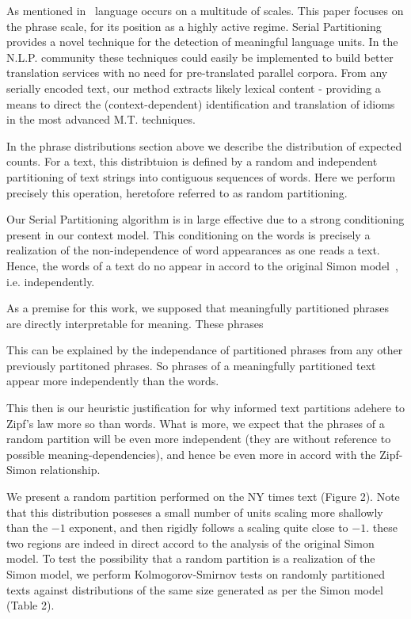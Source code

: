 As mentioned in~\cite{williams2013a} language occurs on a multitude of
scales. 
This paper focuses on the phrase scale, for its position as a highly
active regime.
Serial Partitioning provides a novel technique for the detection of
meaningful language units.  
In the N.L.P. community these techniques could easily be implemented
to build better translation services with no need for pre-translated
parallel corpora.  
From any serially encoded text, our method extracts likely lexical
content - providing a means to direct the (context-dependent)
identification and translation of idioms in the most advanced
M.T. techniques.

In the phrase distributions section above we describe the distribution
of expected counts.
For a text, this distribtuion is defined by a random and independent
partitioning of text strings into contiguous sequences of words.
Here we perform precisely this operation, heretofore referred to as
random partitioning.

Our Serial Partitioning algorithm is in large effective due to a
strong conditioning present in our context model.
This conditioning on the words is precisely a realization of the
non-independence of word appearances as one reads a text.
Hence, the words of a text do no appear in accord to the original
Simon model~\cite{simon1955a}, i.e. independently.

As a premise for this work, we supposed that meaningfully partitioned
phrases are directly interpretable for meaning.
These phrases

This can be explained by the independance of partitioned phrases from
any other previously partitoned phrases. 
So phrases of a meaningfully partitioned text appear more
independently than the words.

 
This then is our heuristic justification for why informed text
partitions adehere to Zipf's law more so than words.
What is more, we expect that the phrases of a random partition will be
even more independent (they are without reference to possible
meaning-dependencies), and hence be even more in accord with the
Zipf-Simon relationship.

We present a random partition performed on the NY times text (Figure
2).
Note that this distribution posseses a small number of units scaling
more shallowly than the $-1$ exponent, and then rigidly follows a
scaling quite close to $-1$.
these two regions are indeed in direct accord to the analysis of the
original Simon model.
To test the possibility that a random partition is a realization of
the Simon model, we perform Kolmogorov-Smirnov  tests on randomly partitioned texts against
distributions of the same size generated as per the Simon model (Table
2).




